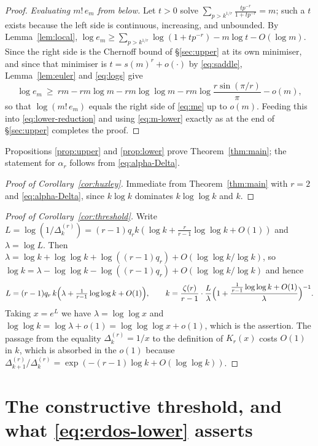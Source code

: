 \documentclass[10pt,a4paper]{amsart}
\numberwithin{equation}{section}
\begin{document}
\begin{proof}
\emph{Evaluating $m!\,e_m$ from below.}
Let $t>0$ solve $\sum_{p>k^{1/r}}\frac{tp^{-r}}{1+tp^{-r}}=m$; such a $t$ exists because the
left side is continuous, increasing, and unbounded. By Lemma~\ref{lem:local},
$\log e_m\ge\sum_{p>k^{1/r}}\log(1+tp^{-r})-m\log t-O(\log m)$. Since the right side is the
Chernoff bound of \S\ref{sec:upper} at its own minimiser, and since that minimiser is
$t=s(m)^{r}+o(\cdot)$ by \eqref{eq:saddle}, Lemma~\ref{lem:euler} and \eqref{eq:logs} give
\[
  \log e_m\ \ge\ rm-rm\log m-rm\log\log m-rm\log\frac{r\sin(\pi/r)}{\pi}-o(m),
\]
so that $\log(m!\,e_m)$ equals the right side of \eqref{eq:me} up to $o(m)$. Feeding this
into \eqref{eq:lower-reduction} and using \eqref{eq:m-lower} exactly as at the end of
\S\ref{sec:upper} completes the proof.
\end{proof}

Propositions \ref{prop:upper} and \ref{prop:lower} prove Theorem~\ref{thm:main}; the
statement for $\alpha_r$ follows from \eqref{eq:alpha-Delta}.


\begin{proof}[Proof of Corollary~\ref{cor:huxley}]
Immediate from Theorem~\ref{thm:main} with $r=2$ and \eqref{eq:alpha-Delta}, since
$k\log k$ dominates $k\log\log k$ and $k$.
\end{proof}


\begin{proof}[Proof of Corollary~\ref{cor:threshold}]
Write $L=\log(1/\Delta^{(r)}_k)=(r-1)q_rk(\log k+\frac{r}{r-1}\log\log k+O(1))$ and
$\lambda=\log L$. Then $\lambda=\log k+\log\log k+\log((r-1)q_r)+O(\log\log k/\log k)$, so
$\log k=\lambda-\log\log k-\log((r-1)q_r)+O(\log\log k/\log k)$ and hence
\[
  L=(r-1)q_r\,k\Bigl(\lambda+\tfrac1{r-1}\log\log k+O(1)\Bigr),\qquad
  k=\frac{\zeta(r)}{r-1}\cdot\frac{L}{\lambda}
  \Bigl(1+\frac{\frac1{r-1}\log\log k+O(1)}{\lambda}\Bigr)^{-1}.
\]
Taking $x=e^{L}$ we have $\lambda=\log\log x$ and
$\log\log k=\log\lambda+o(1)=\log\log\log x+o(1)$, which is the assertion. The passage from
the equality $\Delta^{(r)}_k=1/x$ to the definition of $K_r(x)$ costs $O(1)$ in $k$, which
is absorbed in the $o(1)$ because
$\Delta^{(r)}_{k+1}/\Delta^{(r)}_k=\exp(-(r-1)\log k+O(\log\log k))$.
\end{proof}

\section{The constructive threshold, and what \eqref{eq:erdos-lower} asserts}
\label{sec:constructive}
\end{document}
